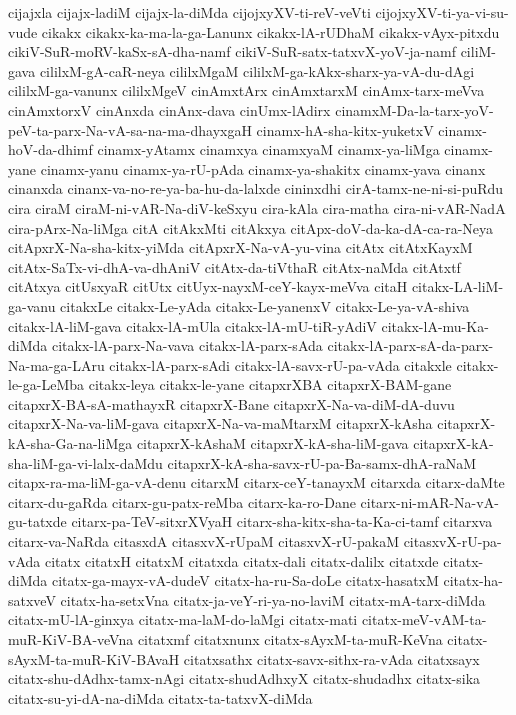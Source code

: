{cijajxla
cijajx-ladiM
cijajx-la-diMda
cijojxyXV-ti-reV-veVti
cijojxyXV-ti-ya-vi-su-vude
cikakx
cikakx-ka-ma-la-ga-Lanunx
cikakx-lA-rUDhaM
cikakx-vAyx-pitxdu
cikiV-SuR-moRV-kaSx-sA-dha-namf
cikiV-SuR-satx-tatxvX-yoV-ja-namf
ciliM-gava
cililxM-gA-caR-neya
cililxMgaM
cililxM-ga-kAkx-sharx-ya-vA-du-dAgi
cililxM-ga-vanunx
cililxMgeV
cinAmxtArx
cinAmxtarxM
cinAmx-tarx-meVva
cinAmxtorxV
cinAnxda
cinAnx-dava
cinUmx-lAdirx
cinamxM-Da-la-tarx-yoV-peV-ta-parx-Na-vA-sa-na-ma-dhayxgaH
cinamx-hA-sha-kitx-yuketxV
cinamx-hoV-da-dhimf
cinamx-yAtamx
cinamxya
cinamxyaM
cinamx-ya-liMga
cinamx-yane
cinamx-yanu
cinamx-ya-rU-pAda
cinamx-ya-shakitx
cinamx-yava
cinanx
cinanxda
cinanx-va-no-re-ya-ba-hu-da-lalxde
cininxdhi
cirA-tamx-ne-ni-si-puRdu
cira
ciraM
ciraM-ni-vAR-Na-diV-keSxyu
cira-kAla
cira-matha
cira-ni-vAR-NadA
cira-pArx-Na-liMga
citA
citAkxMti
citAkxya
citApx-doV-da-ka-dA-ca-ra-Neya
citApxrX-Na-sha-kitx-yiMda
citApxrX-Na-vA-yu-vina
citAtx
citAtxKayxM
citAtx-SaTx-vi-dhA-va-dhAniV
citAtx-da-tiVthaR
citAtx-naMda
citAtxtf
citAtxya
citUsxyaR
citUtx
citUyx-nayxM-ceY-kayx-meVva
citaH
citakx-LA-liM-ga-vanu
citakxLe
citakx-Le-yAda
citakx-Le-yanenxV
citakx-Le-ya-vA-shiva
citakx-lA-liM-gava
citakx-lA-mUla
citakx-lA-mU-tiR-yAdiV
citakx-lA-mu-Ka-diMda
citakx-lA-parx-Na-vava
citakx-lA-parx-sAda
citakx-lA-parx-sA-da-parx-Na-ma-ga-LAru
citakx-lA-parx-sAdi
citakx-lA-savx-rU-pa-vAda
citakxle
citakx-le-ga-LeMba
citakx-leya
citakx-le-yane
citapxrXBA
citapxrX-BAM-gane
citapxrX-BA-sA-mathayxR
citapxrX-Bane
citapxrX-Na-va-diM-dA-duvu
citapxrX-Na-va-liM-gava
citapxrX-Na-va-maMtarxM
citapxrX-kAsha
citapxrX-kA-sha-Ga-na-liMga
citapxrX-kAshaM
citapxrX-kA-sha-liM-gava
citapxrX-kA-sha-liM-ga-vi-lalx-daMdu
citapxrX-kA-sha-savx-rU-pa-Ba-samx-dhA-raNaM
citapx-ra-ma-liM-ga-vA-denu
citarxM
citarx-ceY-tanayxM
citarxda
citarx-daMte
citarx-du-gaRda
citarx-gu-patx-reMba
citarx-ka-ro-Dane
citarx-ni-mAR-Na-vA-gu-tatxde
citarx-pa-TeV-sitxrXVyaH
citarx-sha-kitx-sha-ta-Ka-ci-tamf
citarxva
citarx-va-NaRda
citasxdA
citasxvX-rUpaM
citasxvX-rU-pakaM
citasxvX-rU-pa-vAda
citatx
citatxH
citatxM
citatxda
citatx-dali
citatx-dalilx
citatxde
citatx-diMda
citatx-ga-mayx-vA-dudeV
citatx-ha-ru-Sa-doLe
citatx-hasatxM
citatx-ha-satxveV
citatx-ha-setxVna
citatx-ja-veY-ri-ya-no-laviM
citatx-mA-tarx-diMda
citatx-mU-lA-ginxya
citatx-ma-laM-do-laMgi
citatx-mati
citatx-meV-vAM-ta-muR-KiV-BA-veVna
citatxmf
citatxnunx
citatx-sAyxM-ta-muR-KeVna
citatx-sAyxM-ta-muR-KiV-BAvaH
citatxsathx
citatx-savx-sithx-ra-vAda
citatxsayx
citatx-shu-dAdhx-tamx-nAgi
citatx-shudAdhxyX
citatx-shudadhx
citatx-sika
citatx-su-yi-dA-na-diMda
citatx-ta-tatxvX-diMda
}
